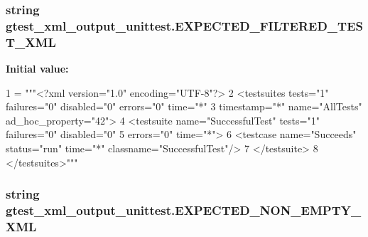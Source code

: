 \hypertarget{namespacegtest__xml__output__unittest_a1adb060422f833cb8b99403d13144399}{
\subsubsection[{E\-X\-P\-E\-C\-T\-E\-D\-\_\-\-F\-I\-L\-T\-E\-R\-E\-D\-\_\-\-T\-E\-S\-T\-\_\-\-X\-M\-L}]{\setlength{\rightskip}{0pt plus 5cm}string gtest\-\_\-xml\-\_\-output\-\_\-unittest.\-E\-X\-P\-E\-C\-T\-E\-D\-\_\-\-F\-I\-L\-T\-E\-R\-E\-D\-\_\-\-T\-E\-S\-T\-\_\-\-X\-M\-L}}\label{namespacegtest__xml__output__unittest_a1adb060422f833cb8b99403d13144399}
{\bfseries Initial value\-:}
\begin{DoxyCode}
1 = \textcolor{stringliteral}{"""<?xml version="1.0" encoding="UTF-8"?>}
2 \textcolor{stringliteral}{<testsuites tests="1" failures="0" disabled="0" errors="0" time="*"}
3 \textcolor{stringliteral}{            timestamp="*" name="AllTests" ad\_hoc\_property="42">}
4 \textcolor{stringliteral}{  <testsuite name="SuccessfulTest" tests="1" failures="0" disabled="0"}
5 \textcolor{stringliteral}{             errors="0" time="*">}
6 \textcolor{stringliteral}{    <testcase name="Succeeds" status="run" time="*" classname="SuccessfulTest"/>}
7 \textcolor{stringliteral}{  </testsuite>}
8 \textcolor{stringliteral}{</testsuites>"""}
\end{DoxyCode}
\hypertarget{namespacegtest__xml__output__unittest_ab6a01b4b81a702e476f53b1b3c4983c0}{
\subsubsection[{E\-X\-P\-E\-C\-T\-E\-D\-\_\-\-N\-O\-N\-\_\-\-E\-M\-P\-T\-Y\-\_\-\-X\-M\-L}]{\setlength{\rightskip}{0pt plus 5cm}string gtest\-\_\-xml\-\_\-output\-\_\-unittest.\-E\-X\-P\-E\-C\-T\-E\-D\-\_\-\-N\-O\-N\-\_\-\-E\-M\-P\-T\-Y\-\_\-\-X\-M\-L}}\label{namespacegtest__xml__output__unittest_ab6a01b4b81a702e476f53b1b3c4983c0}
